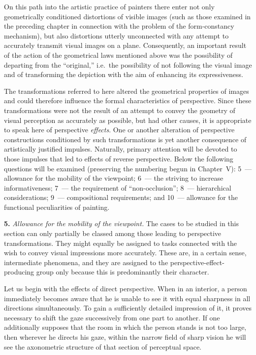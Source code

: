 
On this path into the artistic practice of painters there enter not only geometrically
conditioned distortions of visible images (such as those examined in the preceding
chapter in connection with the problem of the form-constancy mechanism), but also
distortions utterly unconnected with any attempt to accurately transmit visual images
on a plane.  Consequently, an important result of the action of the geometrical laws
mentioned above was the possibility of departing from the ``original,'' i.e.\ the
possibility of not following the visual image and of transforming the depiction with
the aim of enhancing its expressiveness.

The transformations referred to here altered the geometrical properties of images and
could therefore influence the formal characteristics of perspective.  Since these
transformations were not the result of an attempt to convey the geometry of visual
perception as accurately as possible, but had other causes, it is appropriate to
speak here of perspective \emph{effects}.  One or another alteration of perspective
constructions conditioned by such transformations is yet another consequence of
artistically justified impulses.  Naturally, primary attention will be devoted to
those impulses that led to effects of reverse perspective.  Below the following
questions will be examined (preserving the numbering begun in Chapter~V): 5~---
allowance for the mobility of the viewpoint; 6~--- the striving to increase
informativeness; 7~--- the requirement of ``non-occlusion''; 8~--- hierarchical
considerations; 9~--- compositional requirements; and 10~--- allowance for the
functional peculiarities of painting.

\medskip
\noindent\textbf{5.}\quad
\emph{Allowance for the mobility of the viewpoint.}  The cases to be studied in this
section can only partially be classed among those leading to perspective
transformations.  They might equally be assigned to tasks connected with the wish to
convey visual impressions more accurately.  These are, in a certain sense,
intermediate phenomena, and they are assigned to the perspective-effect-producing
group only because this is predominantly their character.

Let us begin with the effects of direct perspective.  When in an interior, a person
immediately becomes aware that he is unable to see it with equal sharpness in all
directions simultaneously.  To gain a sufficiently detailed impression of it, it
proves necessary to shift the gaze successively from one part to another.  If one
additionally supposes that the room in which the person stands is not too large, then
wherever he directs his gaze, within the narrow field of sharp vision he will see the
axonometric structure of that section of perceptual space.

